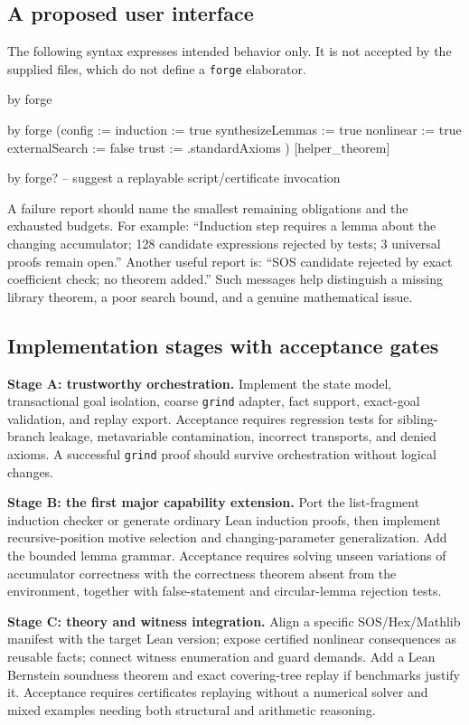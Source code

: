 \documentclass[11pt,a4paper]{article}
\newcommand{\code}[1]{\texttt{#1}}
\begin{document}
\subsection{A proposed user interface}
The following syntax expresses intended behavior only. It is not accepted by
the supplied files, which do not define a \code{forge} elaborator.
\begin{Code}
by
  forge

by
  forge (config := {
    induction := true
    synthesizeLemmas := true
    nonlinear := true
    externalSearch := false
    trust := .standardAxioms
  }) [helper_theorem]

by
  forge?  -- suggest a replayable script/certificate invocation
\end{Code}

A failure report should name the smallest remaining obligations and the
exhausted budgets. For example: ``Induction step requires a lemma about the
changing accumulator; 128 candidate expressions rejected by tests; 3 universal
proofs remain open.'' Another useful report is: ``SOS candidate rejected by
exact coefficient check; no theorem added.'' Such messages help distinguish a
missing library theorem, a poor search bound, and a genuine mathematical issue.

\subsection{Implementation stages with acceptance gates}
\textbf{Stage A: trustworthy orchestration.} Implement the state model,
transactional goal isolation, coarse \code{grind} adapter, fact support,
exact-goal validation, and replay export. Acceptance requires regression tests
for sibling-branch leakage, metavariable contamination, incorrect transports,
and denied axioms. A successful \code{grind} proof should survive orchestration
without logical changes.

\textbf{Stage B: the first major capability extension.} Port the list-fragment
induction checker or generate ordinary Lean induction proofs, then implement
recursive-position motive selection and changing-parameter generalization.
Add the bounded lemma grammar. Acceptance requires solving unseen variations
of accumulator correctness with the correctness theorem absent from the
environment, together with false-statement and circular-lemma rejection tests.

\textbf{Stage C: theory and witness integration.} Align a specific SOS/Hex/Mathlib
manifest with the target Lean version; expose certified nonlinear consequences
as reusable facts; connect witness enumeration and guard demands. Add a Lean
Bernstein soundness theorem and exact covering-tree replay if benchmarks justify
it. Acceptance requires certificates replaying without a numerical solver and
mixed examples needing both structural and arithmetic reasoning.
\end{document}
